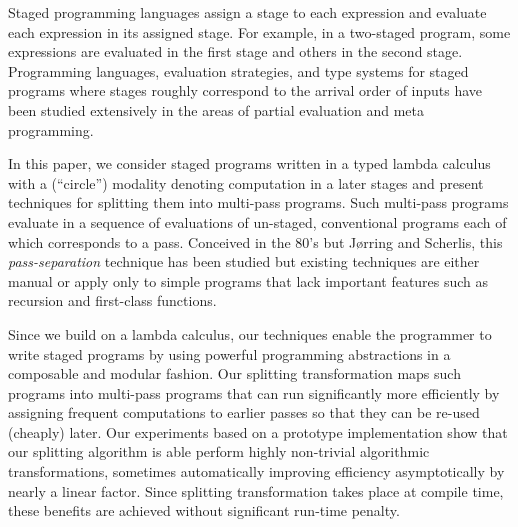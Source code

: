 Staged programming languages assign a stage to each expression and
evaluate each expression in its assigned stage.  For example, in a
two-staged program, some expressions are evaluated in the first stage
and others in the second stage.  Programming languages, evaluation
strategies, and type systems for staged programs where stages roughly
correspond to the arrival order of inputs have been studied
extensively in the areas of partial evaluation and meta programming.

In this paper, we consider staged programs written in a typed lambda
calculus with a (``circle'') modality denoting computation in a later
stages and present techniques for splitting them into multi-pass
programs. Such multi-pass programs evaluate in a sequence of
evaluations of un-staged, conventional programs each of which
corresponds to a pass.  Conceived in the 80's but J{\o}rring and
Scherlis, this {\em pass-separation} technique has been studied but
existing techniques are either manual or apply only to simple programs
that lack important features such as recursion and first-class
functions.



Since we build on a lambda calculus, our techniques enable the
programmer to write staged programs by using powerful programming
abstractions in a composable and modular fashion. Our splitting
transformation maps such programs into multi-pass programs that can
run significantly more efficiently by assigning frequent computations
to earlier passes so that they can be re-used (cheaply) later.  Our
experiments based on a prototype implementation show that our
splitting algorithm is able perform highly non-trivial algorithmic
transformations, sometimes automatically improving efficiency
asymptotically by nearly a linear factor.  Since splitting
transformation takes place at compile time, these benefits are
achieved without significant run-time penalty.





